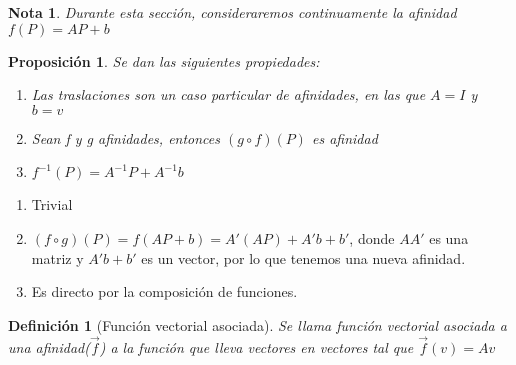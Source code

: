 \documentclass[11pt, a4paper, titlepage]{article}
\makeatletter
\renewenvironment{proof}[1][\proofname] {\vspace{-15pt}\par\pushQED{\qed}\normalfont\topsep6\p@\@plus6\p@\relax\trivlist\item[\hskip\labelsep\it#1\@addpunct{.}]\ignorespaces}{\popQED\endtrivlist\@endpefalse}
\renewcommand{\vec}{\overrightarrow}
\theoremstyle{theorem-style}
\newtheorem*{nprop}{Proposición}
\theoremstyle{definition-style}
\newtheorem*{ndef}{Definición}
\theoremstyle{remark-style}
\newtheorem*{nota}{Nota}
\theoremstyle{example-style}
\newenvironment{nlist}
{\begin{enumerate}
    \renewcommand\labelenumi{(\emph{\roman{enumi})}}}
  {\end{enumerate}}
\makeatother
\begin{document}
\begin{nota}
  Durante esta sección, consideraremos continuamente la afinidad $f(P) = AP + b $
\end{nota}


\begin{nprop}
  Se dan las siguientes propiedades:
  \begin{nlist}
  \item Las traslaciones son un caso particular de afinidades, en las que $A = I$ y $b = v$
  \item Sean f y g afinidades, entonces $(g \circ f) (P)$ es afinidad
  \item $f^{-1}(P) = A^{-1}P +A^{-1}b$
    
  \end{nlist}
\end{nprop}
\begin{proof}
  \begin{nlist}
  \item Trivial
  \item $(f\circ g)(P) = f(AP +b) = A'(AP)+A'b +b' $, donde $AA'$ es una matriz y $A'b+b'$ es un vector, por lo que tenemos una nueva afinidad.
  \item Es directo por la composición de funciones.
  \end{nlist}
\end{proof}

\begin{ndef}[Función vectorial asociada]
  Se llama función vectorial asociada a una afinidad($\vec{f}$) a la función que lleva vectores en vectores tal que $\vec{f}(v) = Av$
\end{ndef}
\end{document}

